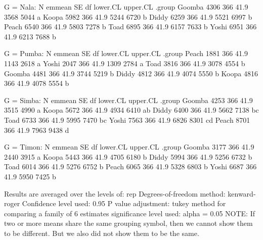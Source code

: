\documentclass[
  letterpaper,
  DIV=11,
  numbers=noendperiod]{scrartcl}
\newenvironment{Shaded}{\begin{snugshade}}{\end{snugshade}}
\newcommand{\NormalTok}[1]{\textcolor[rgb]{0.00,0.23,0.31}{#1}}
\begin{document}
\begin{Shaded}
\begin{Highlighting}[]
\NormalTok{G = Nala:}
\NormalTok{ N      emmean  SE   df lower.CL upper.CL .group}
\NormalTok{ Goomba   4306 366 41.9     3568     5044  a    }
\NormalTok{ Koopa    5982 366 41.9     5244     6720   b   }
\NormalTok{ Diddy    6259 366 41.9     5521     6997   b   }
\NormalTok{ Peach    6540 366 41.9     5803     7278   b   }
\NormalTok{ Toad     6895 366 41.9     6157     7633   b   }
\NormalTok{ Yoshi    6951 366 41.9     6213     7688   b   }

\NormalTok{G = Pumba:}
\NormalTok{ N      emmean  SE   df lower.CL upper.CL .group}
\NormalTok{ Peach    1881 366 41.9     1143     2618  a    }
\NormalTok{ Yoshi    2047 366 41.9     1309     2784  a    }
\NormalTok{ Toad     3816 366 41.9     3078     4554   b   }
\NormalTok{ Goomba   4481 366 41.9     3744     5219   b   }
\NormalTok{ Diddy    4812 366 41.9     4074     5550   b   }
\NormalTok{ Koopa    4816 366 41.9     4078     5554   b   }

\NormalTok{G = Simba:}
\NormalTok{ N      emmean  SE   df lower.CL upper.CL .group}
\NormalTok{ Goomba   4253 366 41.9     3515     4990  a    }
\NormalTok{ Koopa    5672 366 41.9     4934     6410  ab   }
\NormalTok{ Diddy    6400 366 41.9     5662     7138   bc  }
\NormalTok{ Toad     6733 366 41.9     5995     7470   bc  }
\NormalTok{ Yoshi    7563 366 41.9     6826     8301    cd }
\NormalTok{ Peach    8701 366 41.9     7963     9438     d }

\NormalTok{G = Timon:}
\NormalTok{ N      emmean  SE   df lower.CL upper.CL .group}
\NormalTok{ Goomba   3177 366 41.9     2440     3915  a    }
\NormalTok{ Koopa    5443 366 41.9     4705     6180   b   }
\NormalTok{ Diddy    5994 366 41.9     5256     6732   b   }
\NormalTok{ Toad     6014 366 41.9     5276     6752   b   }
\NormalTok{ Peach    6065 366 41.9     5328     6803   b   }
\NormalTok{ Yoshi    6687 366 41.9     5950     7425   b   }

\NormalTok{Results are averaged over the levels of: rep }
\NormalTok{Degrees{-}of{-}freedom method: kenward{-}roger }
\NormalTok{Confidence level used: 0.95 }
\NormalTok{P value adjustment: tukey method for comparing a family of 6 estimates }
\NormalTok{significance level used: alpha = 0.05 }
\NormalTok{NOTE: If two or more means share the same grouping symbol,}
\NormalTok{      then we cannot show them to be different.}
\NormalTok{      But we also did not show them to be the same. }
\end{Highlighting}
\end{Shaded}
\end{document}
